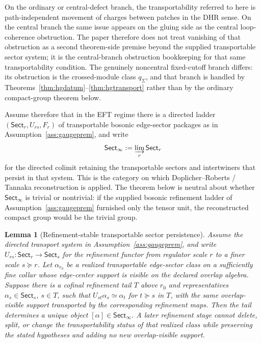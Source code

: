 \documentclass[11pt]{article}
\newtheorem{lemma}[theorem]{Lemma}
\begin{document}
On the ordinary or central-defect branch, the transportability referred to here is path-independent movement of charges between patches in the DHR sense. On the central branch the same issue appears on the gluing side as the central loop-coherence obstruction. The paper therefore does not treat vanishing of that obstruction as a second theorem-side premise beyond the supplied transportable sector system; it is the central-branch obstruction bookkeeping for that same transportability condition. The genuinely noncentral fixed-cutoff branch differs: its obstruction is the crossed-module class \(q_\Sigma\), and that branch is handled by Theorems~\ref{thm:hgdatum}--\ref{thm:hgtransport} rather than by the ordinary compact-group theorem below.

Assume therefore that in the EFT regime there is a directed ladder \((\mathsf{Sect}_r,U_{rs},F_r)\) of transportable bosonic edge-sector packages as in Assumption~\ref{ass:gaugeprem}, and write
\[
\mathsf{Sect}_\infty := \varinjlim_r \mathsf{Sect}_r
\]
for the directed colimit retaining the transportable sectors and intertwiners that persist in that system. This is the category on which Doplicher--Roberts / Tannaka reconstruction is applied. The theorem below is neutral about whether \(\mathsf{Sect}_\infty\) is trivial or nontrivial: if the supplied bosonic refinement ladder of Assumption~\ref{ass:gaugeprem} furnished only the tensor unit, the reconstructed compact group would be the trivial group.

\begin{lemma}[Refinement-stable transportable sector persistence]\label{lem:sector-persistence}
Assume the directed transport system in Assumption~\ref{ass:gaugeprem}, and write \(U_{rs}:\mathsf{Sect}_r\to\mathsf{Sect}_s\) for the refinement functor from regulator scale \(r\) to a finer scale \(s\succeq r\). Let \(\alpha_{r_0}\) be a realized transportable edge-sector class on a sufficiently fine collar whose edge-center support is visible on the declared overlap algebra. Suppose there is a cofinal refinement tail \(T\) above \(r_0\) and representatives \(\alpha_s\in\mathsf{Sect}_s\), \(s\in T\), such that \(U_{st}\alpha_s\simeq \alpha_t\) for \(t\succeq s\) in \(T\), with the same overlap-visible support transported by the corresponding refinement maps. Then the tail determines a unique object \([\alpha]\in\mathsf{Sect}_\infty\). A later refinement stage cannot delete, split, or change the transportability status of that realized class while preserving the stated hypotheses and adding no new overlap-visible support.
\end{lemma}
\end{document}
